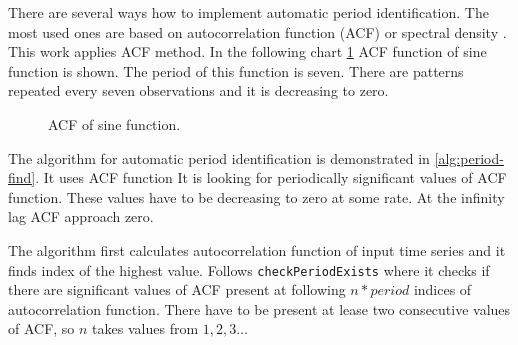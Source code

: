     There are several ways how to implement automatic period identification. The most used ones are based on
    autocorrelation function (ACF) or spectral density \cite{period-hydman}. This work applies ACF method.
    In the following chart \ref{img:period-acf} ACF function of sine function is shown. The period of this
    function is seven. There are patterns repeated every seven observations and it is decreasing to zero.

    \begin{figure}[H]
        \begin{center}
            \caption{ACF of sine function.}
            \label{img:period-acf}
        \end{center}
    \end{figure}

    The algorithm for automatic period identification is demonstrated in \ref{alg:period-find}. It uses ACF function
    It is looking for periodically significant values of ACF function. These values have to be decreasing to zero at
    some rate. At the infinity lag ACF approach zero.

    The algorithm first calculates autocorrelation function of input time series and it finds index of the highest
    value. Follows \texttt{checkPeriodExists} where it checks if there are significant values of ACF present at following $n*period$
    indices of autocorrelation function. There have to be present at lease two consecutive values of ACF, so $n$ takes
    values from $1,2,3\dots$

